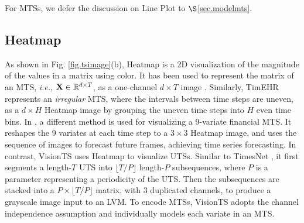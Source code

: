 For MTSs, we defer the discussion on Line Plot to $\S$\ref{sec.modelmts}.




\vspace{-0.08cm}

\subsection{Heatmap}\label{sec.heatmap}

As shown in Fig. \ref{fig.tsimage}(b), Heatmap is a 2D visualization of the magnitude of the values in a matrix using color. %
It has been used to %
represent the matrix of an MTS, {\em i.e.}, ${\bf X} \in \mathbb{R}^{d\times T}$, as a one-channel $d\times T$ image \cite{li2022tts,yazdanbakhsh2019multivariate}. Similarly, TimEHR \cite{karami2024timehr} represents an {\em irregular} MTS, where the intervals between time steps are uneven, as a $d\times H$ Heatmap image by grouping the uneven time steps into $H$ even time bins. In \cite{zeng2021deep}, a different method is used for visualizing a 9-variate financial %
MTS. It reshapes the 9 variates at each time step to a $3\times 3$ Heatmap image, and uses the sequence of images to forecast future %
frames, achieving %
time series forecasting. In contrast, VisionTS \cite{chen2024visionts} uses Heatmap to visualize UTSs. %
Similar to TimesNet \cite{wu2023timesnet}, it first segments a length-$T$ UTS into $\lfloor T/P\rfloor$ length-$P$ subsequences, where $P$ is a parameter representing a periodicity of the UTS. Then the subsequences are stacked into a $P\times \lfloor T/P\rfloor$ matrix, %
with 3 duplicated channels, to produce a grayscale image %
input to %
an LVM. To encode MTSs, VisionTS adopts the channel independence assumption \cite{nie2023time} and individually models each variate in an MTS.

